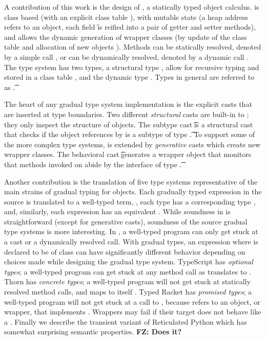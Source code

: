 \documentclass[acmlarge, anonymous, authordraft]{acmart}
\newcommand{\FZ}[1]{\textbf{FZ: #1}}
\renewcommand{\u}[1]{\underline{#1}\xspace}
\begin{document}
A contribution of this work is the design of \kafka, a statically typed object
calculus.  \kafka is class based (with an explicit class table \K), with mutable
state (a heap address \a refers to an object, each field \f is reified into a
pair of getter and setter methods), and allows the dynamic generation of wrapper
classes (by update of the class table \K and allocation of new objects \a).
Methods can be statically resolved, denoted by a simple call \Call\a\m\x, or can
be dynamically resolved, denoted by a dynamic call \DynCall\a\m\x. The \kafka
type system has two types, a structural type \C, allow for recursive typing 
and stored in a class table \K, and the dynamic
type \any. Types in general are referred to as \t.

The heart of any gradual type system implementation is the explicit casts
that are inserted at type boundaries.  Two different \emph{structural} casts
are built-in to \kafka; they only inspect the structure of objects.  The
subtype cast \SubCast\t\a is a structural cast that checks if the object
references by \a is a subtype of type \t. 
To support some of the more complex type systems,
\kafka is extended by \emph{generative} casts which create new wrapper
classes.  The behavioral cast \BehCast\t\a generates a wrapper object that
monitors that methods invoked on \a abide by the interface of type \t. 

Another contribution is the translation of five type systems representative
of the main strains of gradual typing for objects. Each gradually typed
expression \HT{\u\e}{\u\T} in the source is translated to a well-typed
\kafka term, \HT\e\T, each type \u\T has a corresponding \kafka type \T,
and, similarly, each expression \u\e has an equivalent \e. While soundness
in \kafka is straightforward (except for generative casts), soundness of the
source gradual type systems is more interesting.  In \kafka, a well-typed
program can only get stuck at a cast or a dynamically resolved call.  With
gradual types, an expression \Call{\u\x}\m{\u{\x'}} where \u\x is declared
to be of class \u\C can have significantly different behavior depending on
choices made while designing the gradual type system. TypeScript has
\emph{optional types}; a well-typed program can get stuck at any method call
as \u\C translates to \any. Thorn has \emph{concrete types}; a well-typed
program will not get stuck at statically resolved method calls, and \u\C
maps to itself \C. Typed Racket has \emph{promised types}; a well-typed
program will not get stuck at a call to \m, because \u\x refers to an
object, or wrapper, that implements \m.  Wrappers may fail if their target
does not behave like a \u\C. Finally we describe the 
transient variant of Reticulated Python which has somewhat surprising
semantic properties. \FZ{Does it?}
\end{document}
